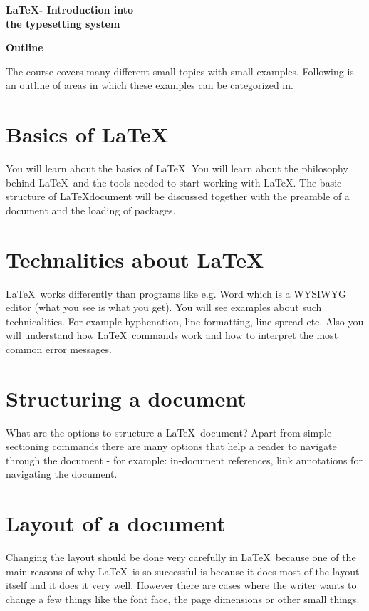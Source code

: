 \documentclass[10pt]{scrartcl}
\begin{document}
{

\hspace*{\fill}\Huge\bfseries \LaTeX - Introduction into\hspace*{\fill} \\\hspace*{\fill}the typesetting system\hspace*{\fill}

\vspace{0.8cm}

\hspace*{\fill}\huge\bfseries  Outline \hspace*{\fill}

\vspace{1cm}
}

The course covers many different small topics with small examples. Following is an outline of areas in which these examples can be categorized in.

    \section{Basics of \LaTeX} %
    You will learn about the basics of \LaTeX. You will learn about the philosophy behind \LaTeX\ and the tools needed to start working with \LaTeX. The basic structure of \LaTeX document will be discussed together with the preamble of a document and the loading of packages.

    \section{Technalities about \LaTeX}
    \LaTeX\ works differently than programs like e.g. Word which is a WYSIWYG editor (what you see is what you get). You will see examples about such technicalities. For example hyphenation, line formatting, line spread etc. Also you will understand how \LaTeX\ commands work and how to interpret the most common error messages.

    \section{Structuring a document}
    What are the options to structure a \LaTeX\ document? Apart from simple sectioning commands there are many options that help a reader to navigate through the document - for example: in-document references, link annotations for navigating the document.

    \section{Layout of a document}
    Changing the layout should be done very carefully in \LaTeX\ because one of the main reasons of why \LaTeX\ is so successful is because it does most of the layout itself and it does it very well. However there are cases where the writer wants to change a few things like the font face, the page dimensions or other small things.
\end{document}
